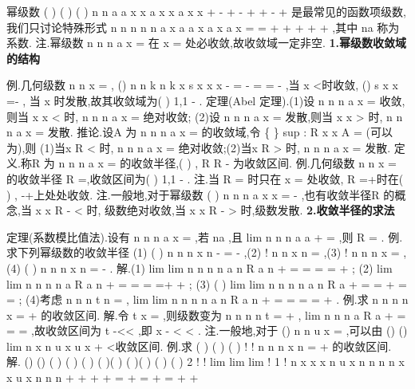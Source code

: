 \textcolor{lyred}{幂级数}
(
)
(
)
(
)
n
n
a
a
x
x
a
x
x
a
x
x
+
-
+
-
+
+
-
+
\Lambda 
\Lambda 是最常见的函数项级数, 
我们只讨论特殊形式
n
n
n
n
n
a x
a
a x
a x
a x
\infty 
=
=
+
+
+
+
+
\sum 
\Lambda 
\Lambda ,其中
na 称为\textcolor{lyred}{系数}. 
\textcolor{lyred}{注}.幂级数
n
n
n
a x
\infty 
=\sum 
在
x =
处必收敛,故收敛域一定非空. 
{\bfseries \textcolor{lyred}{1.幂级数收敛域的结构}}

\textcolor{lyred}{例}.几何级数
n
n
x
\infty 
=\sum 
,
()
n
n
k
n
k
x
s
x
x
x
-
=
-
=
=
-
\sum 
,当
x <时收敛, ()
s x
x
=-
, 
当
x \ge 时发散,故其收敛域为(
)
1,1
-
. 
\textcolor{lyred}{定理(Abel 定理)}.(1)设
n
n
n
a x
\infty 
=\sum 
收敛,则当
x
x
<
时,
n
n
n
a x
\infty 
=\sum 
绝对收敛; 
(2)设
n
n
n
a x
\infty 
=\sum 
发散,则当
x
x
>
时,
n
n
n
a x
\infty 
=\sum 
发散. 
\textcolor{lyred}{推论}.设A 为
n
n
n
a x
\infty 
=\sum 
的收敛域,令
\{
\}
sup
:
R
x
x
A
=
\in 
(可以为\infty ),则 
(1)当x
R
<
时,
n
n
n
a x
\infty 
=\sum 
绝对收敛;(2)当x
R
>
时,
n
n
n
a x
\infty 
=\sum 
发散. 
\textcolor{lyred}{定义}.称R 为
n
n
n
a x
\infty 
=\sum 
的\textcolor{lyred}{收敛半径},(
)
,
R R
-
为\textcolor{lyred}{收敛区间}. 
\textcolor{lyred}{例}.几何级数
n
n
x
\infty 
=\sum 
的收敛半径
R =,收敛区间为(
)
1,1
-
. 
\textcolor{lyred}{注}.当
R =
时只在
x =
处收敛, R =+\infty 时在(
)
,
-\infty +\infty 上处处收敛. 
\textcolor{lyred}{注}.一般地,对于幂级数
(
)
n
n
n
a
x
x
\infty 
=
-
\sum 
,也有收敛半径R 的概念,当
x
x
R
-
<
时, 
级数绝对收敛,当
x
x
R
-
>
时,级数发散. 
{\bfseries \textcolor{lyred}{2.收敛半径的求法}}

\textcolor{lyred}{定理(系数模比值法)}.设有
n
n
n
a x
\infty 
=\sum 
,若
na \neq 
,且
lim
n
n
n
a
a
\rho 
+
\to \infty 
=
,则
R
\rho 
=
. 
\textcolor{lyred}{例}.求下列幂级数的收敛半径 
(1)
(
)
n
n
n
x
n
\infty 
-
=
-
\sum 
,(2)
!
n
n
x
n
\infty 
=\sum 
,(3)
!
n
n
n x
\infty 
=\sum 
,(4)
(
)
n
n
n
x
n
\infty 
=
-
\sum 
. 
解.(1)
lim
lim
n
n
n
n
a
n
R
a
n
\rho 
+
\to \infty 
\to \infty 
=
=
=\Rightarrow 
=
+
; 
(2)
lim
lim
n
n
n
n
a
R
a
n
\rho 
+
\to \infty 
\to \infty 
=
=
=
\Rightarrow 
=+\infty 
+
; 
(3)
(
)
lim
lim
n
n
n
n
a
n
R
a
\rho 
+
\to \infty 
\to \infty 
=
=
+
=\infty \Rightarrow 
=
; 
(4)考虑
n
n
n
t
n
\infty 
=\sum 
,
lim
lim
n
n
n
n
a
n
R
a
n
\rho 
+
\to \infty 
\to \infty 
=
=
=
\Rightarrow 
=
+
. 
\textcolor{lyred}{例}.求
n
n
n
n
x
\infty 
=
+
\sum 
的收敛区间. 
解.令
t
x
=
,则级数变为
n
n
n
n
t
\infty 
=
+
\sum 
,
lim
n
n
n
a
R
a
\rho 
+
\to \infty 
=
=
\Rightarrow 
=
,故收敛区间为 
t
-<<
,即
x
-
<
<
. 
\textcolor{lyred}{注}.一般地,对于
()
n
n
u
x
\infty 
=\sum 
,可以由
()
()
lim
n
x
n
u
x
u
x
+
\to \infty 
<\Rightarrow 收敛区间. 
\textcolor{lyred}{例}.求
(
)
(
)
(
)
!
!
n
n
n
x
n
\infty 
=
+
\sum 
的收敛区间. 
解.
()
()
(
)
(
)
(
)
(
)(
)
(
)(
)
(
)
(
)
2 !
!
lim
lim
lim
!
1 !
n
x
x
x
n
u
x
n
n
n
n
x
x
u
x
n
n
n
+
\to \infty 
\to \infty 
\to \infty 
+
+
+
=
\cdots 
\cdots 
+
=
\cdots 
+
=
+
+




